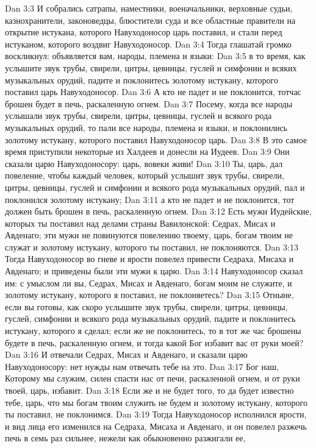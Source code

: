 \vs Dan 3:3 И собрались сатрапы, наместники, военачальники, верховные судьи, казнохранители, законоведцы, блюстители суда и все областные правители на открытие истукана, которого Навуходоносор царь поставил, и стали перед истуканом, которого воздвиг Навуходоносор.
\vs Dan 3:4 Тогда глашатай громко воскликнул: объявляется вам, народы, племена и языки:
\vs Dan 3:5 в то время, как услышите звук трубы, свирели, цитры, цевницы, гуслей и симфонии и всяких музыкальных орудий, падите и поклонитесь золотому истукану, которого поставил царь Навуходоносор.
\vs Dan 3:6 А кто не падет и не поклонится, тотчас брошен будет в печь, раскаленную огнем.
\vs Dan 3:7 Посему, когда все народы услышали звук трубы, свирели, цитры, цевницы, гуслей и всякого рода музыкальных орудий, то пали все народы, племена и языки, и поклонились золотому истукану, которого поставил Навуходоносор царь.
\rsbpar\vs Dan 3:8 В это самое время приступили некоторые из Халдеев и донесли на Иудеев.
\vs Dan 3:9 Они сказали царю Навуходоносору: царь, вовеки живи!
\vs Dan 3:10 Ты, царь, дал повеление, чтобы каждый человек, который услышит звук трубы, свирели, цитры, цевницы, гуслей и симфонии и всякого рода музыкальных орудий, пал и поклонился золотому истукану;
\vs Dan 3:11 а кто не падет и не поклонится, тот должен быть брошен в печь, раскаленную огнем.
\vs Dan 3:12 Есть мужи Иудейские, которых ты поставил над делами страны Вавилонской: Седрах, Мисах и Авденаго; эти мужи не повинуются повелению твоему, царь, богам твоим не служат и золотому истукану, которого ты поставил, не поклоняются.
\vs Dan 3:13 Тогда Навуходоносор во гневе и ярости повелел привести Седраха, Мисаха и Авденаго; и приведены были эти мужи к царю.
\vs Dan 3:14 Навуходоносор сказал им: с умыслом ли вы, Седрах, Мисах и Авденаго, богам моим не служите, и золотому истукану, которого я поставил, не поклоняетесь?
\vs Dan 3:15 Отныне, если вы готовы, как скоро услышите звук трубы, свирели, цитры, цевницы, гуслей, симфонии и всякого рода музыкальных орудий, падите и поклонитесь истукану, которого я сделал; если же не поклонитесь, то в тот же час брошены будете в печь, раскаленную огнем, и тогда какой Бог избавит вас от руки моей?
\vs Dan 3:16 И отвечали Седрах, Мисах и Авденаго, и сказали царю Навуходоносору: нет нужды нам отвечать тебе на это.
\vs Dan 3:17 Бог наш, Которому мы служим, силен спасти нас от печи, раскаленной огнем, и от руки твоей, царь, избавит.
\vs Dan 3:18 Если же и не будет того, то да будет известно тебе, царь, что мы богам твоим служить не будем и золотому истукану, которого ты поставил, не поклонимся.
\vs Dan 3:19 Тогда Навуходоносор исполнился ярости, и вид лица его изменился на Седраха, Мисаха и Авденаго, и он повелел разжечь печь в семь раз сильнее, нежели как обыкновенно разжигали ее,
